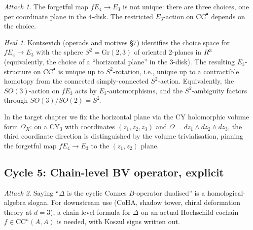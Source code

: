 \documentclass[11pt]{article}
\theoremstyle{definition}
\theoremstyle{remark}
\newtheorem*{attack}{Attack}
\newtheorem*{heal}{Heal}
\newcommand{\CC}{\mathrm{CC}}
\begin{document}
\begin{attack}
The forgetful map $fE_4 \to E_3$ is not unique: there are three
choices, one per coordinate plane in the $4$-disk. The restricted
$E_3$-action on $\CC^\bullet$ depends on the choice.
\end{attack}

\begin{heal}
Kontsevich (operads and motives \S7) identifies the choice space for
$fE_4 \to E_3$ with the sphere $S^2 = \mathrm{Gr}(2,3)$ of oriented
$2$-planes in $R^3$ (equivalently, the choice of a ``horizontal
plane'' in the $3$-disk). The resulting $E_3$-structure on
$\CC^\bullet$ is unique up to $S^2$-rotation, i.e., unique up to a
contractible homotopy from the connected simply-connected $S^2$-action.
Equivalently, the $SO(3)$-action on $fE_3$ acts by $E_3$-automorphisms,
and the $S^2$-ambiguity factors through $SO(3)/SO(2) = S^2$.

In the target chapter we fix the horizontal plane via the CY
holomorphic volume form $\Omega_X$: on a CY$_3$ with coordinates
$(z_1, z_2, z_3)$ and $\Omega = dz_1 \wedge dz_2 \wedge dz_3$, the
third coordinate direction is distinguished by the volume trivialisation,
pinning the forgetful map $fE_4 \to E_3$ to the $(z_1, z_2)$ plane.
\end{heal}

\subsection*{Cycle 5: Chain-level BV operator, explicit}

\begin{attack}
Saying ``$\Delta$ is the cyclic Connes $B$-operator dualised'' is
a homological-algebra slogan. For downstream use (CoHA, shadow
tower, chiral deformation theory at $d = 3$), a chain-level formula
for $\Delta$ on an actual Hochschild cochain $f \in \CC^n(A,A)$ is
needed, with Koszul signs written out.
\end{attack}
\end{document}
